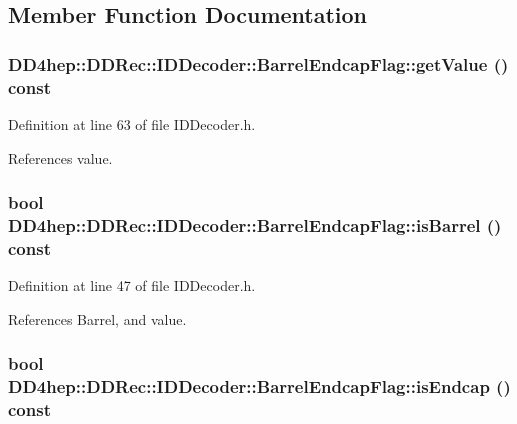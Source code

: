 \subsection{Member Function Documentation}
\hypertarget{class_d_d4hep_1_1_d_d_rec_1_1_i_d_decoder_1_1_barrel_endcap_flag_a514c87353c666b18e6dbbfc2d9dd9136}{
\subsubsection[{getValue}]{ DD4hep::DDRec::IDDecoder::BarrelEndcapFlag::getValue () const}}
\label{class_d_d4hep_1_1_d_d_rec_1_1_i_d_decoder_1_1_barrel_endcap_flag_a514c87353c666b18e6dbbfc2d9dd9136}


Definition at line 63 of file IDDecoder.h.

References value.\hypertarget{class_d_d4hep_1_1_d_d_rec_1_1_i_d_decoder_1_1_barrel_endcap_flag_a4b2c475e311e18ab65eb80f7fd0b9c9d}{
\subsubsection[{isBarrel}]{\setlength{\rightskip}{0pt plus 5cm}bool DD4hep::DDRec::IDDecoder::BarrelEndcapFlag::isBarrel () const}}
\label{class_d_d4hep_1_1_d_d_rec_1_1_i_d_decoder_1_1_barrel_endcap_flag_a4b2c475e311e18ab65eb80f7fd0b9c9d}


Definition at line 47 of file IDDecoder.h.

References Barrel, and value.\hypertarget{class_d_d4hep_1_1_d_d_rec_1_1_i_d_decoder_1_1_barrel_endcap_flag_ad22c146907d9df1396a21cd81246e754}{
\subsubsection[{isEndcap}]{\setlength{\rightskip}{0pt plus 5cm}bool DD4hep::DDRec::IDDecoder::BarrelEndcapFlag::isEndcap () const}}
\label{class_d_d4hep_1_1_d_d_rec_1_1_i_d_decoder_1_1_barrel_endcap_flag_ad22c146907d9df1396a21cd81246e754}


